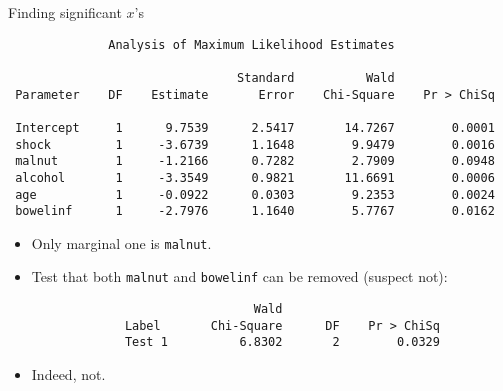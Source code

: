\documentclass[pdf]{prosper}
\begin{document}
\begin{slide}{Finding significant $x$'s}

{\scriptsize
\begin{verbatim}
              Analysis of Maximum Likelihood Estimates
 
                                Standard          Wald
 Parameter    DF    Estimate       Error    Chi-Square    Pr > ChiSq

 Intercept     1      9.7539      2.5417       14.7267        0.0001
 shock         1     -3.6739      1.1648        9.9479        0.0016
 malnut        1     -1.2166      0.7282        2.7909        0.0948
 alcohol       1     -3.3549      0.9821       11.6691        0.0006
 age           1     -0.0922      0.0303        9.2353        0.0024
 bowelinf      1     -2.7976      1.1640        5.7767        0.0162

\end{verbatim}
}

\begin{itemize}
\item 
Only marginal one is \verb-malnut-.
\item Test that both \verb-malnut- and \verb-bowelinf- can be removed (suspect not):

{\scriptsize
\begin{verbatim}
                               Wald
             Label       Chi-Square      DF    Pr > ChiSq
             Test 1          6.8302       2        0.0329
\end{verbatim}
}

\item Indeed, not.
\end{itemize}
  
\end{slide}
\end{document}
